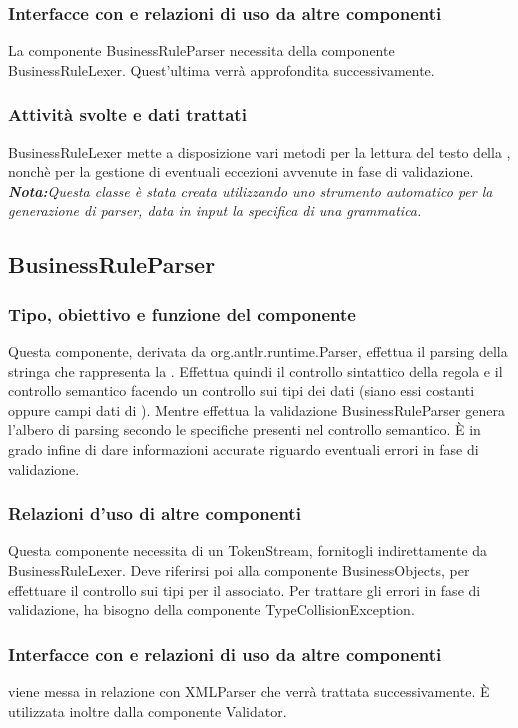 \documentclass[11pt,titlepage,a4paper]{report}
\begin{document}
\subsubsection{Interfacce con e relazioni di uso da altre componenti}
La componente BusinessRuleParser necessita della componente BusinessRuleLexer. Quest'ultima verr\`a approfondita successivamente.
\subsubsection{Attivit\`a svolte e dati trattati}
BusinessRuleLexer mette a disposizione vari metodi per la lettura del testo della \br, nonch\`e per la gestione di eventuali eccezioni avvenute in fase di validazione.\\
\textit{\textbf{Nota:}Questa classe \`e stata creata utilizzando uno strumento automatico per la generazione di parser, data in input la specifica di una grammatica.}

\subsection{BusinessRuleParser}
\subsubsection{Tipo, obiettivo e funzione del componente}
Questa componente, derivata da org.antlr.runtime.Parser, effettua il parsing della stringa che rappresenta la \br. Effettua quindi il controllo sintattico della regola e il controllo semantico facendo un controllo sui tipi dei dati (siano essi costanti oppure campi dati di \bos). Mentre effettua la validazione BusinessRuleParser genera l'albero di parsing secondo le specifiche presenti nel controllo semantico. \`E in grado infine di dare informazioni accurate riguardo eventuali errori in fase di validazione.
\subsubsection{Relazioni d'uso di altre componenti}
Questa componente necessita di un TokenStream, fornitogli indirettamente da BusinessRuleLexer. Deve riferirsi poi alla componente BusinessObjects, per effettuare il controllo sui tipi per il \bo associato. Per trattare gli errori in fase di validazione, ha bisogno della componente TypeCollisionException.
\subsubsection{Interfacce con e relazioni di uso da altre componenti}
\brp viene messa in relazione con XMLParser che verr\`a trattata successivamente.
\`E utilizzata inoltre dalla componente Validator.
\end{document}
